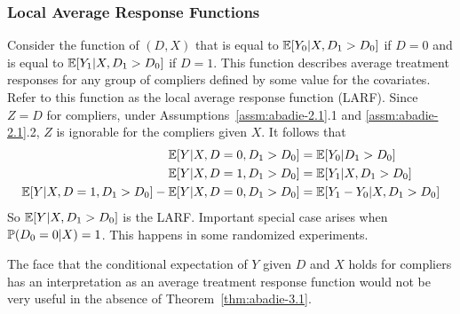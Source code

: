 \subsubsection{Local Average Response Functions}

Consider the function of $(D,X)$ that is equal to $\E[Y_0 | X, D_1 > D_0]$ if $D = 0$ and is equal to $\E[Y_1 | X, D_1 > D_0]$ if $D = 1$. This function describes average treatment responses for any group of compliers defined by some value for the covariates. Refer to this function as the local average response function (LARF). Since $Z = D$ for compliers, under Assumptions~\ref{assm:abadie-2.1}.1 and \ref{assm:abadie-2.1}.2, $Z$ is ignorable for the compliers given $X$. It follows that
\begin{align*}
	\E[Y | X, D= 0, D_1 > D_0] &= \E[Y_0 | D_1 > D_0] \\
	\E[Y | X, D=1, D_1 > D_0] &= \E[Y_1 | X, D_1 > D_0] \\
	\E[Y | X, D=1, D_1 > D_0] - \E[Y|X, D= 0, D_1 > D_0] &= \E[Y_1 - Y_0|X, D_1 > D_0]
\end{align*}
So $\E[Y | X, D_1 > D_0]$ is the LARF. Important special case arises when $\P(D_0 = 0 | X) = 1$. This happens in some randomized experiments.

The face that the conditional expectation of $Y$ given $D$ and $X$ holds for compliers has an interpretation as an average treatment response function would not be very useful in the absence of Theorem~\ref{thm:abadie-3.1}. 












